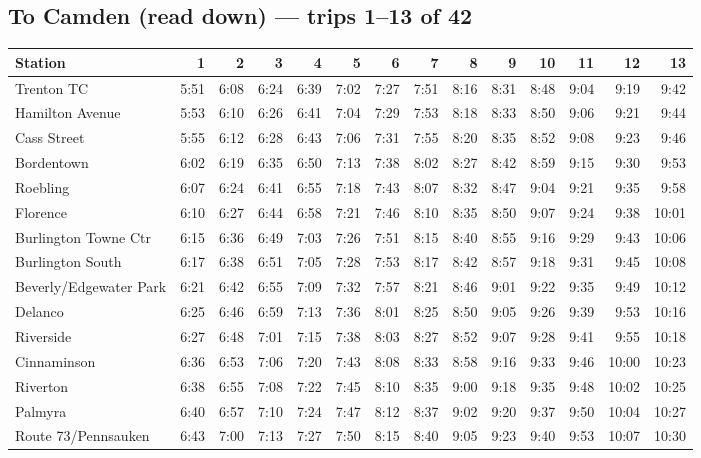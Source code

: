 \subsection*{To Camden (read down) --- trips 1--13 of 42}
\begin{center}\footnotesize\setlength{\tabcolsep}{3pt}\begin{tabular}{@{}lrrrrrrrrrrrrr@{}}\toprule
Station & 1 & 2 & 3 & 4 & 5 & 6 & 7 & 8 & 9 & 10 & 11 & 12 & 13 \\\midrule
Trenton TC & 5:51 & 6:08 & 6:24 & 6:39 & 7:02 & 7:27 & 7:51 & 8:16 & 8:31 & 8:48 & 9:04 & 9:19 & 9:42 \\
Hamilton Avenue & 5:53 & 6:10 & 6:26 & 6:41 & 7:04 & 7:29 & 7:53 & 8:18 & 8:33 & 8:50 & 9:06 & 9:21 & 9:44 \\
Cass Street & 5:55 & 6:12 & 6:28 & 6:43 & 7:06 & 7:31 & 7:55 & 8:20 & 8:35 & 8:52 & 9:08 & 9:23 & 9:46 \\
Bordentown & 6:02 & 6:19 & 6:35 & 6:50 & 7:13 & 7:38 & 8:02 & 8:27 & 8:42 & 8:59 & 9:15 & 9:30 & 9:53 \\
Roebling & 6:07 & 6:24 & 6:41 & 6:55 & 7:18 & 7:43 & 8:07 & 8:32 & 8:47 & 9:04 & 9:21 & 9:35 & 9:58 \\
Florence & 6:10 & 6:27 & 6:44 & 6:58 & 7:21 & 7:46 & 8:10 & 8:35 & 8:50 & 9:07 & 9:24 & 9:38 & 10:01 \\
Burlington Towne Ctr & 6:15 & 6:36 & 6:49 & 7:03 & 7:26 & 7:51 & 8:15 & 8:40 & 8:55 & 9:16 & 9:29 & 9:43 & 10:06 \\
Burlington South & 6:17 & 6:38 & 6:51 & 7:05 & 7:28 & 7:53 & 8:17 & 8:42 & 8:57 & 9:18 & 9:31 & 9:45 & 10:08 \\
Beverly/Edgewater Park & 6:21 & 6:42 & 6:55 & 7:09 & 7:32 & 7:57 & 8:21 & 8:46 & 9:01 & 9:22 & 9:35 & 9:49 & 10:12 \\
Delanco & 6:25 & 6:46 & 6:59 & 7:13 & 7:36 & 8:01 & 8:25 & 8:50 & 9:05 & 9:26 & 9:39 & 9:53 & 10:16 \\
Riverside & 6:27 & 6:48 & 7:01 & 7:15 & 7:38 & 8:03 & 8:27 & 8:52 & 9:07 & 9:28 & 9:41 & 9:55 & 10:18 \\
Cinnaminson & 6:36 & 6:53 & 7:06 & 7:20 & 7:43 & 8:08 & 8:33 & 8:58 & 9:16 & 9:33 & 9:46 & 10:00 & 10:23 \\
Riverton & 6:38 & 6:55 & 7:08 & 7:22 & 7:45 & 8:10 & 8:35 & 9:00 & 9:18 & 9:35 & 9:48 & 10:02 & 10:25 \\
Palmyra & 6:40 & 6:57 & 7:10 & 7:24 & 7:47 & 8:12 & 8:37 & 9:02 & 9:20 & 9:37 & 9:50 & 10:04 & 10:27 \\
Route 73/Pennsauken & 6:43 & 7:00 & 7:13 & 7:27 & 7:50 & 8:15 & 8:40 & 9:05 & 9:23 & 9:40 & 9:53 & 10:07 & 10:30 \\

\end{tabular}
\end{center}
